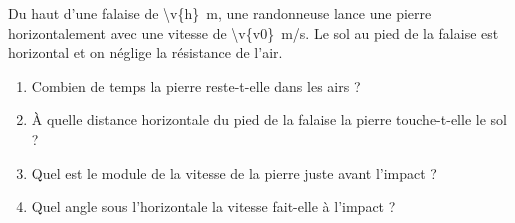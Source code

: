 Du haut d'une falaise de \qty{\v{h}}{m}, une randonneuse lance une pierre horizontalement avec une vitesse de \qty{\v{v0}}{m/s}. Le sol au pied de la falaise est horizontal et on néglige la résistance de l'air.

\begin{center}
\end{center}

\begin{enumerate}[label=\alph*)]
    \item Combien de temps la pierre reste-t-elle dans les airs ?
    \item À quelle distance horizontale du pied de la falaise la pierre touche-t-elle le sol ?
    \item Quel est le module de la vitesse de la pierre juste avant l'impact ?
    \item Quel angle sous l'horizontale la vitesse fait-elle à l'impact ?
\end{enumerate}
